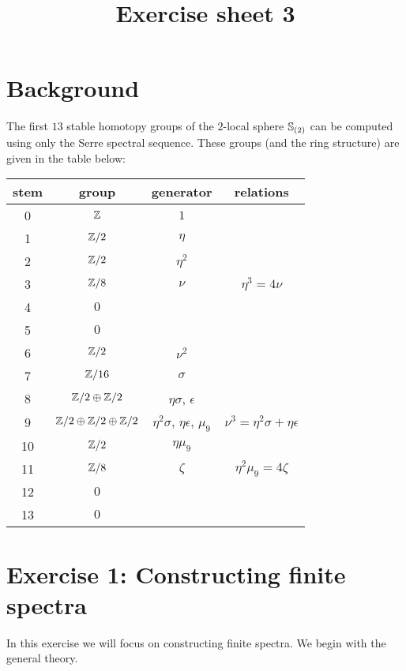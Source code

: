 \documentclass[reqno]{amsart}
\title{Exercise sheet 3}
\begin{document}
\maketitle


\section*{\bf Background}

The first $13$ stable homotopy groups of the $2$-local sphere $\mathbb{S}_{(2)}$ can be computed using only the Serre spectral sequence. 
These groups (and the ring structure) are given in the table below:

\begin{center}
  \begin{tabular}{|c|c|c|c|}\hline
    stem & group & generator & relations \\\hline\hline
    0 & $\mathbb{Z}$ & $1$ & \\\hline
    1 & $\mathbb{Z}/2$ & $\eta$ & \\\hline
    2 & $\mathbb{Z}/2$ & $\eta^2$ & \\\hline
    3 & $\mathbb{Z}/8$ & $\nu$ & $\eta^3 = 4\nu$ \\\hline
    4 & $0$ & & \\\hline
    5 & $0$ & & \\\hline
    6 & $\mathbb{Z}/2$ & $\nu^2$ & \\\hline
    7 & $\mathbb{Z}/16$ & $\sigma$ & \\\hline
    8 & $\mathbb{Z}/2 \oplus \mathbb{Z}/2$ & $\eta\sigma$, $\epsilon$ & \\\hline
    9 & $\mathbb{Z}/2 \oplus \mathbb{Z}/2 \oplus \mathbb{Z}/2$ & $\eta^2\sigma$, $\eta\epsilon$, $\mu_9$ & $\nu^3 = \eta^2\sigma + \eta\epsilon$ \\\hline
    10 & $\mathbb{Z}/2$ & $\eta\mu_9$ & \\\hline
    11 & $\mathbb{Z}/8$ & $\zeta$ & $\eta^2\mu_9 = 4\zeta$ \\\hline
    12 & $0$ & & \\\hline
    13 & $0$& & \\\hline
  \end{tabular}
\end{center}


\section{\bf Exercise 1: Constructing finite spectra}

In this exercise we will focus on constructing finite spectra.
We begin with the general theory.
\end{document}

